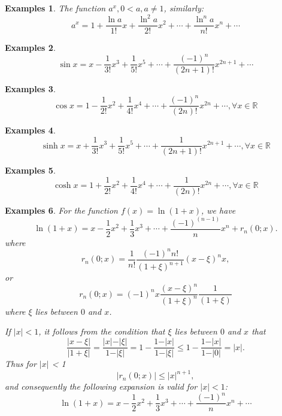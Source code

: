 \documentclass[a4paper,12pt]{article} %
\newtheorem{example}{Examples}
\begin{document}
\begin{example}
    \normalfont
    The function $a^x, 0<a, a\ne 1$, similarly:
    \[
        a^x = 1 + \frac{\ln a}{1!}x + \frac{\ln^2a}{2!}x^2 + \cdots + \frac{\ln^na}{n!}x^n + \cdots
        \]
\end{example}

\begin{example}
    \[
        \sin x = x - \frac{1}{3!}x^3 + \frac{1}{5!}x^5 + \cdots + \frac{(-1)^n}{(2n+1)!}x^{2n+1} + \cdots
        \]
\end{example}

\begin{example}
    \[
        \cos x = 1 - \frac{1}{2!}x^2 + \frac{1}{4!}x^4 + \cdots + \frac{(-1)^n}{(2n)!}x^{2n} + \cdots, \forall x \in \mathbb{R}
        \]
\end{example}

\begin{example}
    \[
        \sinh x = x + \frac{1}{3!}x^3 + \frac{1}{5!}x^5 + \cdots + \frac{1}{(2n+1)!}x^{2n+1}+ \cdots, \forall x \in \mathbb{R}
        \]
\end{example}
\begin{example}
    \[
        \cosh x = 1 + \frac{1}{2!}x^2 + \frac{1}{4!}x^4 + \cdots + \frac{1}{(2n)!}x^{2n}+ \cdots, \forall x \in \mathbb{R}
        \]
\end{example}

\begin{example}
    \normalfont
    For the function $f(x) = \ln (1+x)$, we have 
    \[
        \ln (1+x) = x - \frac{1}{2}x^2 + \frac{1}{3}x^3 + \cdots + \frac{(-1)^{(n-1)}}{n}x^n + r_n(0;x).
        \]
    where 
    \[
        r_n(0;x) = \frac{1}{n!}\frac{(-1)^nn!}{(1+\xi)^{n+1}}(x - \xi)^nx,
        \]
    or 
    \[
        r_n(0;x) = (-1)^nx\frac{(x - \xi)^n}{(1+\xi)^n}\frac{1}{(1+\xi)}
        \]
    where $\xi$ lies between $0$ and $x$.

    If $\vert x \vert < 1$, it follows from the condition that $\xi $  lies between $0$ and $x$ that 
    \[
        \frac{\vert x - \xi \vert}{\vert 1 + \xi \vert}  = \frac{\vert x \vert - \vert \xi \vert}{1 - \vert \xi \vert} 
        = 1 - \frac{1 - \vert x \vert}{1 - \vert \xi \vert} \le 1 - \frac{1 - \vert x \vert}{1 - \vert 0 \vert} 
        = \vert x \vert.
        \]
    Thus for $\vert x \vert$ < 1
    \[
        \vert r_n(0;x) \vert \le \vert x \vert^{n+1},
        \]
    and consequently the following expansion is valid for $\vert x \vert < 1$:
    \[
        \ln (1+x) = x - \frac{1}{2}x^2 + \frac{1}{3}x^3 + \cdots + \frac{(-1)^n}{n}x^n + \cdots
        \]
\end{example}
\end{document}
